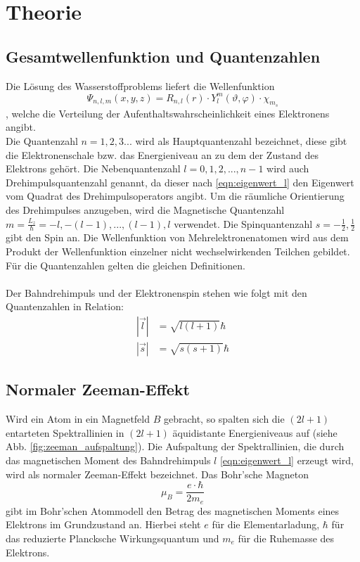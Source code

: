 \section{Theorie}
\label{sec:Theorie}

\subsection{Gesamtwellenfunktion und Quantenzahlen}
Die Lösung des Wasserstoffproblems liefert die Wellenfunktion
\begin{equation*}
    \Psi_{n, l, m} (x, y, z) = R_{n, l}(r) \cdot Y_l^m (\vartheta, \varphi) \cdot \chi_{m_s}
\end{equation*}
, welche die Verteilung der Aufenthaltswahrscheinlichkeit eines Elektronens angibt.\\
Die Quantenzahl $n = 1, 2, 3 ...$ wird als Hauptquantenzahl bezeichnet, diese gibt die Elektronenschale bzw. das Energieniveau an zu dem der Zustand des Elektrons gehört.
Die Nebenquantenzahl $l = 0, 1, 2, ..., n-1 $ wird auch Drehimpulsquantenzahl genannt, da dieser nach \autoref{eqn:eigenwert_l} den Eigenwert vom Quadrat des Drehimpulsoperators angibt. 
Um die räumliche Orientierung des Drehimpulses anzugeben, wird die Magnetische Quantenzahl $m = \frac{L_z}{\hbar} = -l, - (l-1), ..., (l-1), l$ verwendet.
Die Spinquantenzahl $s = -\frac{1}{2} , \frac{1}{2}$ gibt den Spin an.
Die Wellenfunktion von Mehrelektronenatomen wird aus dem Produkt der Wellenfunktion einzelner nicht wechselwirkenden Teilchen gebildet.
Für die Quantenzahlen gelten die gleichen Definitionen.
\\ \\
Der Bahndrehimpuls und der Elektronenspin stehen wie folgt mit den Quantenzahlen in Relation:
\begin{align}
    |\vec{l}| &= \sqrt{l(l+1)} \hbar \label{eqn:eigenwert_l} \\
    |\vec{s}| &= \sqrt{s(s+1)} \hbar \label{eqn:eigenwert_s}
\end{align}
\FloatBarrier

\subsection{Normaler Zeeman-Effekt}
Wird ein Atom in ein Magnetfeld $B$ gebracht, so spalten sich die $(2l + 1)$ entarteten Spektrallinien in $(2l + 1)$ äquidistante Energieniveaus auf (siehe Abb. \ref{fig:zeeman_aufspaltung}).
Die Aufspaltung der Spektrallinien, die durch das magnetischen Moment des Bahndrehimpuls $l$ \eqref{eqn:eigenwert_l} erzeugt wird, wird als normaler Zeeman-Effekt bezeichnet.
Das Bohr'sche Magneton
\begin{equation}
    \mu_B = \frac{e \cdot \hbar}{2 m_e}
    \label{eqn:magneton}
\end{equation}
gibt im Bohr'schen Atommodell den Betrag des magnetischen Moments eines Elektrons im Grundzustand an.
Hierbei steht $e$ für die Elementarladung, $\hbar$ für das reduzierte Plancksche Wirkungsquantum und $m_e$ für die Ruhemasse des Elektrons.

